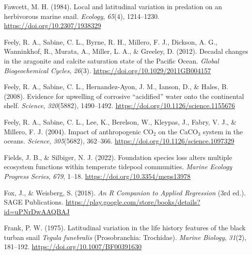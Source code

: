 \documentclass{CSUNthesis}
\begin{document}
\vspace{0.1em}

Fawcett, M. H. (1984). Local and latitudinal variation in predation on an herbivorous marine snail. \textit{Ecology}, \textit{65}(4), 1214--1230. \url{https://doi.org/10.2307/1938329}

\vspace{0.1em}

Feely, R. A., Sabine, C. L., Byrne, R. H., Millero, F. J., Dickson, A. G., Wanninkhof, R., Murata, A., Miller, L. A., \& Greeley, D. (2012). Decadal changes in the aragonite and calcite saturation state of the Pacific Ocean. \textit{Global Biogeochemical Cycles}, \textit{26}(3). \url{https://doi.org/10.1029/2011GB004157}

\vspace{0.1em}

Feely, R. A., Sabine, C. L., Hernandez-Ayon, J. M., Ianson, D., \& Hales, B. (2008). Evidence for upwelling of corrosive ``acidified'' water onto the continental shelf. \textit{Science}, \textit{320}(5882), 1490--1492. \url{https://doi.org/10.1126/science.1155676}

\vspace{0.1em}

Feely, R. A., Sabine, C. L., Lee, K., Berelson, W., Kleypas, J., Fabry, V. J., \& Millero, F. J. (2004). Impact of anthropogenic CO\(_2\) on the CaCO\(_3\) system in the oceans. \textit{Science}, \textit{305}(5682), 362--366. \url{https://doi.org/10.1126/science.1097329}

\vspace{0.1em}

Fields, J. B., \& Silbiger, N. J. (2022). Foundation species loss alters multiple ecosystem functions within temperate tidepool communities. \textit{Marine Ecology Progress Series}, \textit{679}, 1--18. \url{https://doi.org/10.3354/meps13978}

\vspace{0.1em}

Fox, J., \& Weisberg, S. (2018). \textit{An R Companion to Applied Regression} (3rd ed.). SAGE Publications. \url{https://play.google.com/store/books/details?id=uPNrDwAAQBAJ}

\vspace{0.1em}

Frank, P. W. (1975). Latitudinal variation in the life history features of the black turban snail \textit{Tegula funebralis} (Prosobranchia: Trochidae). \textit{Marine Biology}, \textit{31}(2), 181--192. \url{https://doi.org/10.1007/BF00391630}
\end{document}
